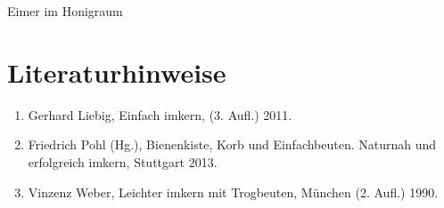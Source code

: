 \documentclass[12pt,a4paper,ngerman]{scrartcl}
\begin{document}
Eimer im Honigraum


\section{Literaturhinweise}

\begin{enumerate}
\item Gerhard Liebig, Einfach imkern, (3. Aufl.) 2011.
\item Friedrich Pohl (Hg.), Bienenkiste, Korb und Einfachbeuten. Naturnah und erfolgreich imkern, Stuttgart 2013.
\item Vinzenz Weber, Leichter imkern mit Trogbeuten, München (2. Aufl.) 1990.
\end{enumerate}
\end{document}
